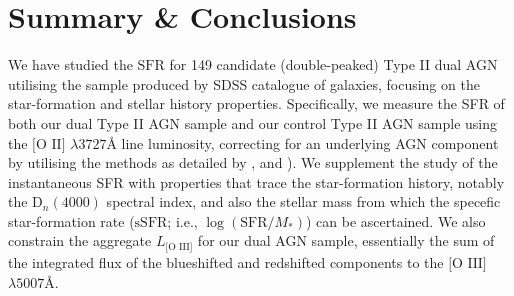 \section{Summary \& Conclusions}

We have studied the $\text{SFR}$ for 149 candidate (double-peaked) Type II dual AGN utilising the sample produced by \cite{Liu_2009} SDSS catalogue of galaxies, focusing on the star-formation and stellar history properties. Specifically, we measure the SFR of both our dual Type II AGN sample and our control Type II AGN sample using the $\text{[O II]}$ $\lambda3727$Å line luminosity, correcting for an underlying AGN component by utilising the methods as detailed by \cite{Ho_2005}, \cite{Kim_2006} and \cite{Silverman_2009}). We supplement the study of the instantaneous SFR with properties that trace the star-formation history, notably the $\text{D}_{n}(4000)$ spectral index, and also the stellar mass from which the specefic star-formation rate ($\text{sSFR}$; i.e., $\log{(\text{SFR}/M_{*})}$) can be ascertained. We also constrain the aggregate $L_{\text{[O III]}}$ for our dual AGN sample, essentially the sum of the integrated flux of the blueshifted and redshifted components to the $\text{[O III]}$ $\lambda5007$Å.     
  
  
  
  
  
  
  